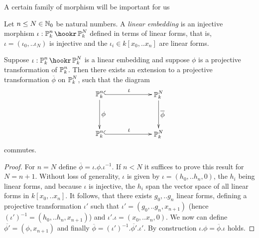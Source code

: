 A certain family of morphism will be important for us
\begin{definition}
Let $n \leq N \in \operatorname{\mathbb N_0}$ be natural numbers.
A \emph{linear embedding} is an injective morphism $\iota : \proj^n_k \hookr \proj^N_k$ defined in terms of linear forms, that is, $\iota = (\iota_0,..\iota_N)$ is injective and the $\iota_i \in k[x_0,..x_n]$ are linear forms.
\end{definition}

\begin{proposition} \label{propositionLiftingAutomorphisms}
Suppose $\iota : \proj^n_k \hookr \proj^N_k$ is a linear embedding and suppose $\phi$ is a projective transformation of $\operatorname{\mathbb P}^n_k$.
Then there exists an extension to a projective transformation $\overline\phi$ on $\operatorname{\mathbb P}^N_k$, such that the diagram
\begin{equation}
\begin{xy}
(0,20)*+{\proj^n_k}="n";
(30,20)*+{\proj^N_k}="N";
(0,0)*+{\proj^n_k}="n1";
(30,0)*+{\proj^N_k}="N1";
{\ar@{^{(}->} "n";"N"}?*!/_2mm/{\iota};
{\ar@{^{(}->} "n1";"N1"}?*!/_2mm/{\iota};
{\ar@{->} "n";"n1"}?*!/_2mm/{\phi};
{\ar@{->} "N";"N1"}?*!/_2mm/{\overline{\phi}};
\end{xy}
\end{equation}
commutes.
\end{proposition}
\begin{proof}
For $n=N$ define $\overline\phi = \iota.\phi.\iota^{-1}$.
If $n < N$ it suffices to prove this result for $N = n+1$.
Without loss of generality, $\iota$ is given by $\iota = (h_0,..h_n,0)$, the $h_i$ being linear forms, and because $\iota$ is injective, the $h_i$ span the vector space of all linear forms in $k[x_0,..x_n]$.
It follows, that there exists $g_0,..g_n$ linear forms, defining a projective transformation $\iota'$ such that $\iota' = (g_0,..g_n,x_{n+1})$ (hence $(\iota')^{-1} = (h_0,..h_n,x_{n+1})$) and $\iota'.\iota = (x_0,..x_n,0)$.
We now can define $\overline{\phi'} = (\phi,x_{n+1})$ and finally $\overline\phi = (\iota')^{-1}.\overline{\phi'}.\iota'$.
By construction $\iota.\phi = \overline\phi . \iota$ holds.
\end{proof}


